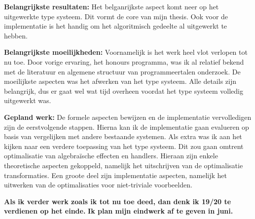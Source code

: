 \documentclass[12pt]{report}
\begin{document}
\vspace{1cm}
{\bf Belangrijkste resultaten:}
Het belganrijkste aspect komt neer op het uitgewerkte type systeem. Dit vormt de core van mijn thesis. Ook voor de implementatie is het handig om het algoritmisch gedeelte al uitgewerkt te hebben.


\vspace{1cm}
{\bf Belangrijkste moeilijkheden:}
Voornamelijk is het werk heel vlot verlopen tot nu toe. Door vorige ervaring, het honours programma, was ik al relatief bekend met de literatuur en algemene structuur van programmeertalen onderzoek. De moeilijkste aspecten was het afwerken van het type systeem. Alle details zijn belangrijk, dus er gaat wel wat tijd overheen voordat het type systeem volledig uitgewerkt was.

\vspace{1cm}
{\bf Gepland werk:}
De formele aspecten bewijzen en de implementatie vervolledigen zijn de eerstvolgende stappen. Hierna kan ik de implementatie gaan evalueren op basis van vergelijken met andere bestaande systemen. Als extra was ik aan het kijken naar een verdere toepassing van het type systeem. Dit zou gaan omtrent optimalisatie van algebraïsche effecten en handlers. Hieraan zijn enkele theoretische aspecten gekoppeld, namelijk het uitschrijven van de optimalisatie transformaties. Een groote deel zijn implementatie aspecten, namelijk het uitwerken van de optimalisaties voor niet-triviale voorbeelden.


\vspace{1cm}
{\bf Als ik verder werk zoals ik tot nu toe deed, dan denk ik 19/20 te verdienen op het einde.}
{\bf Ik plan mijn eindwerk af te geven in juni.}
\end{document}
